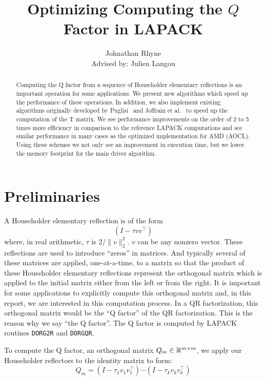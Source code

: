 \documentclass[12pt]{article}
\title{Optimizing Computing the $Q$ Factor in LAPACK}
\author{Johnathan Rhyne\\ Advised by: Julien Langou}
\begin{document}
    \maketitle
    \begin{abstract}
    Computing the Q factor from a sequence of Householder elementary reflections is an important operation for some 
    applications. We present new algorithms which speed up the performance of these operations. In addition, we also 
    implement existing algorithms originally developed by Puglisi~\cite{Puglisi} and Joffrain et al.~\cite{Joff} to speed up the computation of the T matrix. We see 
    performance improvements on the order of 2 to 5 times more efficiency in comparison to the reference LAPACK 
    computations and see similar performance in many cases as the optimized implementation for AMD (AOCL). Using these 
    schemes we not only see an improvement in execution time, but we lower the memory footprint for the main driver 
    algorithm.
    \end{abstract}


    \section{Preliminaries}
    A Householder elementary reflection is of the form
    \begin{equation}\label{eq:Q}
        \left(I - \tau vv^\top\right)
    \end{equation}
    where, in real arithmetic, $\tau$ is $2/\|v\|_2^2$. $v$ can be any nonzero vector.
    These reflections are used to introduce ``zeros'' in matrices. And typically several of these matrices are applied, one-at-a-time, 
    to a matrix so that the product of these Householder elementary reflections represent the orthogonal matrix which is applied to
    the initial matrix either from the left or from the right. It is important for some applications to explicitly compute this orthogonal matrix and, in this report, we are interested in
    this computation process. In a QR factorization, this orthogonal matrix would be the ``Q factor'' of the QR factorization. This is the 
    reason why we say ``the Q factor''. The Q factor is computed by LAPACK routines \verb|DORG2R| and \verb|DORGQR|.

    To compute the Q factor, an orthogonal matrix $Q_m\in\mathbb{R}^{m\times m}$, we apply our Householder reflectors to the identity matrix to form:
    \begin{equation}\label{eq:Q}
        Q_m = \left(I - \tau_1 v_1v_1^\top\right)\cdots\left(I - \tau_kv_kv_k^\top\right)
    \end{equation}
\end{document}
